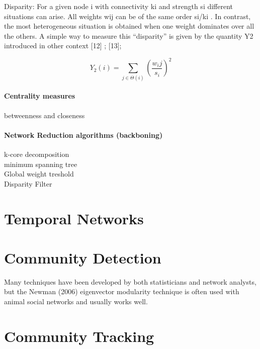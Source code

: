 Disparity: For a given node i   with connectivity  ki  and strength  si  different situations can arise. All weights  wij  can be of the same order  si/ki . In contrast, the most heterogeneous situation is obtained when one weight dominates over all the others. A simple way to measure this “disparity” is given by the quantity  Y2  introduced in other context [12] ;  [13];

$$Y_2(i)=\sum_{j\in \Theta(i)} (\frac{w_ij}{s_i})^2$$

\paragraph*{Centrality measures}
betweenness and closeness

\paragraph{Network Reduction algorithms (backboning)}
k-core decomposition\\
minimum spanning tree\\
Global weight treshold\\
Disparity Filter\\


\section{Temporal Networks}

\section{Community Detection}

Many techniques have been developed by both statisticians and network analysts, but the Newman (2006) eigenvector modularity technique is often used with animal social networks and usually works well.~\cite{farine2015constructing}

\section{Community Tracking}
